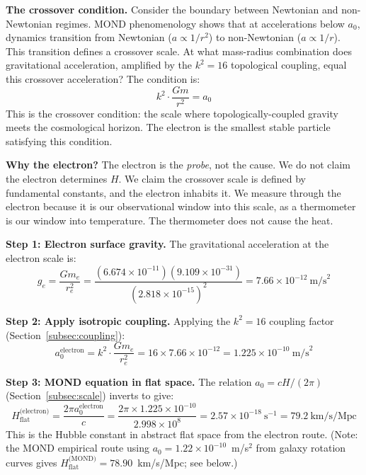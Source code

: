\documentclass[aps,prd,preprint,superscriptaddress,showpacs,preprintnumbers,amsmath,amssymb,nofootinbib]{revtex4-2}
\begin{document}
\textbf{The crossover condition.} Consider the boundary between Newtonian and non-Newtonian regimes. MOND phenomenology shows that at accelerations below $a_0$, dynamics transition from Newtonian ($a \propto 1/r^2$) to non-Newtonian ($a \propto 1/r$). This transition defines a crossover scale. At what mass-radius combination does gravitational acceleration, amplified by the $k^2 = 16$ topological coupling, equal this crossover acceleration? The condition is:
\begin{equation}
k^2 \cdot \frac{Gm}{r^2} = a_0
\label{eq:crossover}
\end{equation}
This is the crossover condition: the scale where topologically-coupled gravity meets the cosmological horizon. The electron is the smallest stable particle satisfying this condition.

\textbf{Why the electron?} The electron is the \emph{probe}, not the cause. We do not claim the electron determines $H$. We claim the crossover scale is defined by fundamental constants, and the electron inhabits it. We measure through the electron because it is our observational window into this scale, as a thermometer is our window into temperature. The thermometer does not cause the heat.

\textbf{Step 1: Electron surface gravity.} The gravitational acceleration at the electron scale is:
\begin{equation}
g_e = \frac{Gm_e}{r_e^2} = \frac{(6.674 \times 10^{-11})(9.109 \times 10^{-31})}{(2.818 \times 10^{-15})^2} = 7.66 \times 10^{-12}~\text{m/s}^2
\end{equation}

\textbf{Step 2: Apply isotropic coupling.} Applying the $k^2 = 16$ coupling factor (Section~\ref{subsec:coupling}):
\begin{equation}
a_0^{\text{electron}} = k^2 \cdot \frac{Gm_e}{r_e^2} = 16 \times 7.66 \times 10^{-12} = 1.225 \times 10^{-10}~\text{m/s}^2
\label{eq:a0electron}
\end{equation}

\textbf{Step 3: MOND equation in flat space.} The relation $a_0 = cH/(2\pi)$ (Section~\ref{subsec:scale}) inverts to give:
\begin{equation}
H_{\text{flat}}^{\text{(electron)}} = \frac{2\pi a_0^{\text{electron}}}{c} = \frac{2\pi \times 1.225 \times 10^{-10}}{2.998 \times 10^{8}} = 2.57 \times 10^{-18}~\text{s}^{-1} = 79.2~\text{km/s/Mpc}
\label{eq:hflat}
\end{equation}
This is the Hubble constant in abstract flat space from the electron route. (Note: the MOND empirical route using $a_0 = 1.22 \times 10^{-10}$~m/s$^2$ from galaxy rotation curves gives $H_{\text{flat}}^{\text{(MOND)}} = 78.90$~km/s/Mpc; see below.)
\end{document}
